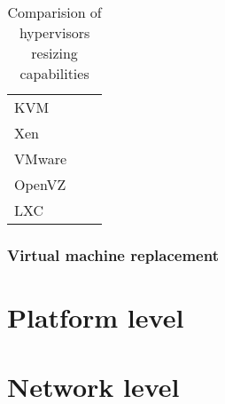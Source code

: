 \begin{table}[!htbp]
\begin{tabularx}{\textwidth}{l | X | X}
 &  & \\
\hline 
KVM &  & \\
\hline
Xen &  & \\
\hline
VMware &  & \\
\hline
OpenVZ &  & \\
\hline
LXC &  &  \\
\end{tabularx}
\caption{Comparision of hypervisors resizing capabilities}
\label{tab:hypervisors-resizing}
\end{table}

\subsubsection*{Virtual machine replacement}

\section{Platform level}

\section{Network level}
